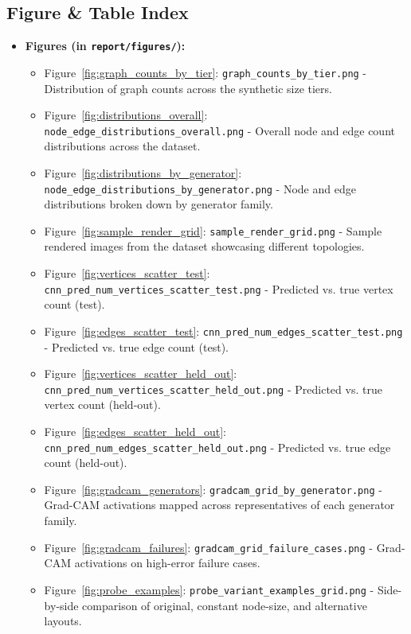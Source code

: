 \documentclass[11pt,letterpaper]{article}
\numberwithin{equation}{section}
\numberwithin{figure}{section}
\numberwithin{table}{section}
\begin{document}
\subsection*{Figure \& Table Index}
\begin{itemize}
    \item \textbf{Figures (in \texttt{report/figures/}):}
    \begin{itemize}
        \item Figure~\ref{fig:graph_counts_by_tier}: \texttt{graph\_counts\_by\_tier.png} - Distribution of graph counts across the synthetic size tiers.
        \item Figure~\ref{fig:distributions_overall}: \texttt{node\_edge\_distributions\_overall.png} - Overall node and edge count distributions across the dataset.
        \item Figure~\ref{fig:distributions_by_generator}: \texttt{node\_edge\_distributions\_by\_generator.png} - Node and edge distributions broken down by generator family.
        \item Figure~\ref{fig:sample_render_grid}: \texttt{sample\_render\_grid.png} - Sample rendered images from the dataset showcasing different topologies.
        \item Figure~\ref{fig:vertices_scatter_test}: \texttt{cnn\_pred\_num\_vertices\_scatter\_test.png} - Predicted vs. true vertex count (test).
        \item Figure~\ref{fig:edges_scatter_test}: \texttt{cnn\_pred\_num\_edges\_scatter\_test.png} - Predicted vs. true edge count (test).
        \item Figure~\ref{fig:vertices_scatter_held_out}: \texttt{cnn\_pred\_num\_vertices\_scatter\_held\_out.png} - Predicted vs. true vertex count (held-out).
        \item Figure~\ref{fig:edges_scatter_held_out}: \texttt{cnn\_pred\_num\_edges\_scatter\_held\_out.png} - Predicted vs. true edge count (held-out).
        \item Figure~\ref{fig:gradcam_generators}: \texttt{gradcam\_grid\_by\_generator.png} - Grad-CAM activations mapped across representatives of each generator family.
        \item Figure~\ref{fig:gradcam_failures}: \texttt{gradcam\_grid\_failure\_cases.png} - Grad-CAM activations on high-error failure cases.
        \item Figure~\ref{fig:probe_examples}: \texttt{probe\_variant\_examples\_grid.png} - Side-by-side comparison of original, constant node-size, and alternative layouts.

\end{itemize}
\end{itemize}
\end{document}
